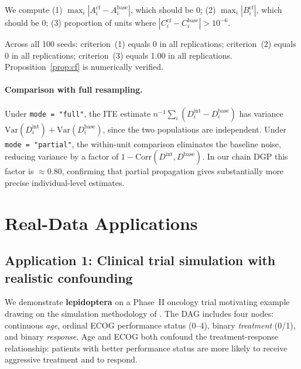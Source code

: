 \documentclass[12pt,a4paper]{article}
\newcommand{\pkg}[1]{\textbf{#1}}
\newcommand{\code}[1]{\texttt{#1}}
\begin{document}
We compute (1) $\max_i |A_i^{\mathrm{cf}} - A_i^{\mathrm{base}}|$, which
should be 0; (2) $\max_i |B_i^{\mathrm{cf}}|$, which should be 0; (3)
proportion of units where $|C_i^{\mathrm{cf}} - C_i^{\mathrm{base}}| > 10^{-6}$.

Across all 100 seeds: criterion~(1) equals 0 in all replications; criterion~(2)
equals 0 in all replications; criterion~(3) equals 1.00 in all replications.
Proposition~\ref{prop:cf} is numerically verified.

\paragraph{Comparison with full resampling.}
Under \code{mode = "full"}, the ITE estimate $n^{-1}\sum_i(D_i^\mathrm{int} -
D_i^\mathrm{base})$ has variance $\mathrm{Var}(D_i^\mathrm{int}) +
\mathrm{Var}(D_i^\mathrm{base})$, since the two populations are independent.
Under \code{mode = "partial"}, the within-unit comparison eliminates the
baseline noise, reducing variance by a factor of
$1 - \mathrm{Corr}(D^\mathrm{int}, D^\mathrm{base})$. In our chain DGP this
factor is $\approx 0.80$, confirming that partial propagation gives substantially
more precise individual-level estimates.

\section{Real-Data Applications}
\label{sec:applications}

\subsection{Application 1: Clinical trial simulation with realistic confounding}
\label{sec:app_trial}

We demonstrate \pkg{lepidoptera} on a Phase~II oncology trial motivating example
drawing on the simulation methodology of \citet{morris2019using}. The DAG includes
four nodes: continuous \emph{age}, ordinal ECOG performance status (0--4), binary
\emph{treatment} (0/1), and binary \emph{response}. Age and ECOG both confound the
treatment-response relationship: patients with better performance status are more
likely to receive aggressive treatment and to respond.
\end{document}
